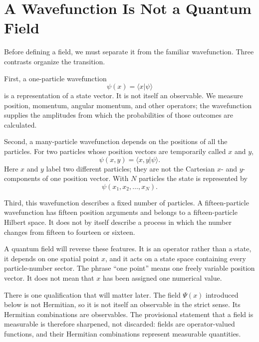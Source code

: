 \section{A Wavefunction Is Not a Quantum Field}

Before defining a field, we must separate it from the familiar wavefunction. Three contrasts organize the transition.

First, a one-particle wavefunction
\begin{equation}
\psi(x)=\langle x|\psi\rangle
\end{equation}
is a representation of a state vector. It is not itself an observable. We measure position, momentum, angular momentum, and other operators; the wavefunction supplies the amplitudes from which the probabilities of those outcomes are calculated.

Second, a many-particle wavefunction depends on the positions of all the particles. For two particles whose position vectors are temporarily called \(x\) and \(y\),
\begin{equation}
\psi(x,y)=\langle x,y|\psi\rangle.
\end{equation}
Here \(x\) and \(y\) label two different particles; they are not the Cartesian \(x\)- and \(y\)-components of one position vector. With \(N\) particles the state is represented by
\begin{equation}
\psi(x_1,x_2,\ldots,x_N).
\end{equation}

Third, this wavefunction describes a fixed number of particles. A fifteen-particle wavefunction has fifteen position arguments and belongs to a fifteen-particle Hilbert space. It does not by itself describe a process in which the number changes from fifteen to fourteen or sixteen.

A quantum field will reverse these features. It is an operator rather than a state, it depends on one spatial point \(x\), and it acts on a state space containing every particle-number sector. The phrase ``one point'' means one freely variable position vector. It does not mean that \(x\) has been assigned one numerical value.

There is one qualification that will matter later. The field \(\Psi(x)\) introduced below is not Hermitian, so it is not itself an observable in the strict sense. Its Hermitian combinations are observables. The provisional statement that a field is measurable is therefore sharpened, not discarded: fields are operator-valued functions, and their Hermitian combinations represent measurable quantities.

